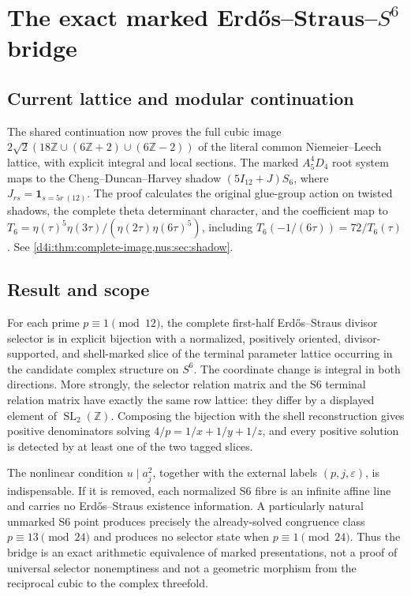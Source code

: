 \providecommand{\ZZ}{\mathbb Z}
\providecommand{\ZZpos}{\mathbb Z_{>0}}
\providecommand{\ES}{\operatorname{ES}}
\providecommand{\Rel}{\operatorname{Rel}}
\providecommand{\coker}{\operatorname{coker}}
\providecommand{\eps}{\varepsilon}

\section{The exact marked Erd\H{o}s--Straus--\texorpdfstring{\(S^6\)}{S6} bridge}
\label{sec:esksb-bridge}

\subsection*{Current lattice and modular continuation}
The shared continuation now proves the full cubic image
$2\sqrt2(18\mathbb Z\cup(6\mathbb Z+2)\cup(6\mathbb Z-2))$
of the literal common Niemeier--Leech lattice, with explicit integral
and local sections. The marked $A_5^4D_4$ root system maps to the
Cheng--Duncan--Harvey shadow $(5I_{12}+J)S_6$, where
$J_{rs}=\mathbf1_{s=5r\ (12)}$. The proof calculates the original
glue-group action on twisted shadows, the complete theta determinant
character, and the coefficient map to
$T_6=\eta(\tau)^5\eta(3\tau)/(\eta(2\tau)\eta(6\tau)^5)$, including
$T_6(-1/(6\tau))=72/T_6(\tau)$.
See \cref{d4i:thm:complete-image,nus:sec:shadow}.

\subsection*{Result and scope}
For each prime \(p\equiv1\pmod {12}\), the complete first-half
Erd\H{o}s--Straus divisor selector is in explicit bijection with a
normalized, positively oriented, divisor-supported, and shell-marked slice of
the terminal parameter lattice occurring in the candidate complex structure
on \(S^6\).  The coordinate change is integral in both directions.  More
strongly, the selector relation matrix and the S6 terminal relation matrix
have exactly the same row lattice: they differ by a displayed element of
\(\operatorname{SL}_2(\ZZ)\).  Composing the bijection with the shell
reconstruction gives positive denominators solving \(4/p=1/x+1/y+1/z\), and
every positive solution is detected by at least one of the two tagged slices.

The nonlinear condition \(u\mid a_j^2\), together with the external labels
\((p,j,\eps)\), is indispensable.  If it is removed, each normalized S6 fibre
is an infinite affine line and carries no Erd\H{o}s--Straus existence
information.  A particularly natural unmarked S6 point produces precisely
the already-solved congruence class \(p\equiv13\pmod {24}\) and produces no
selector state when \(p\equiv1\pmod {24}\).  Thus the bridge is an exact
arithmetic equivalence of marked presentations, not a proof of universal
selector nonemptiness and not a geometric morphism from the reciprocal cubic
to the complex threefold.

